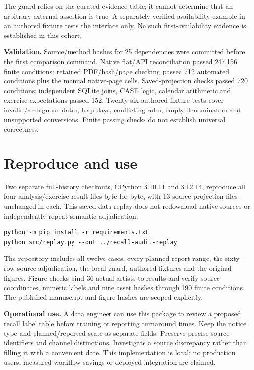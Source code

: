 \documentclass[11pt,letterpaper]{article}
\newcommand{\FreezeCount}{25}
\newcommand{\FigureConditions}{190}
\newcommand{\FigureArtists}{36}
\newcommand{\ReplayOld}{3.10.11}
\newcommand{\ReplaySourcesOld}{13}
\newcommand{\ReplayNew}{3.12.14}
\begin{document}
The guard relies on the curated evidence table; it cannot determine that an arbitrary external assertion is true. A separately verified availability example in an authored fixture tests the interface only. No such first-availability evidence is established in this cohort.

\textbf{Validation.} Source/method hashes for \FreezeCount{} dependencies were committed before the first comparison command. Native flat/API reconciliation passed 247,156 finite conditions; retained PDF/hash/page checking passed 712 automated conditions plus the manual native-page cells. Saved-projection checks passed 720 conditions; independent SQLite joins, CASE logic, calendar arithmetic and exercise expectations passed 152. Twenty-six authored fixture tests cover invalid/ambiguous dates, leap days, conflicting roles, empty denominators and unsupported conversions. Finite passing checks do not establish universal correctness.
\newpage

\section*{Reproduce and use}
Two separate full-history checkouts, CPython \ReplayOld{} and \ReplayNew{}, reproduce all four analysis/exercise result files byte for byte, with \ReplaySourcesOld{} source projection files unchanged in each. This saved-data replay does not redownload native sources or independently repeat semantic adjudication.

\begin{verbatim}
python -m pip install -r requirements.txt
python src/replay.py --out ../recall-audit-replay
\end{verbatim}

The repository includes all twelve cases, every planned report range, the sixty-row source adjudication, the local guard, authored fixtures and the original figures. Figure checks bind \FigureArtists{} actual artists to results and verify source coordinates, numeric labels and nine asset hashes through \FigureConditions{} finite conditions. The published manuscript and figure hashes are scoped explicitly.

\textbf{Operational use.} A data engineer can use this package to review a proposed recall label table before training or reporting turnaround times. Keep the notice type and planned/reported state as separate fields. Preserve precise source identifiers and channel distinctions. Investigate a source discrepancy rather than filling it with a convenient date. This implementation is local; no production users, measured workflow savings or deployed integration are claimed.
\end{document}
